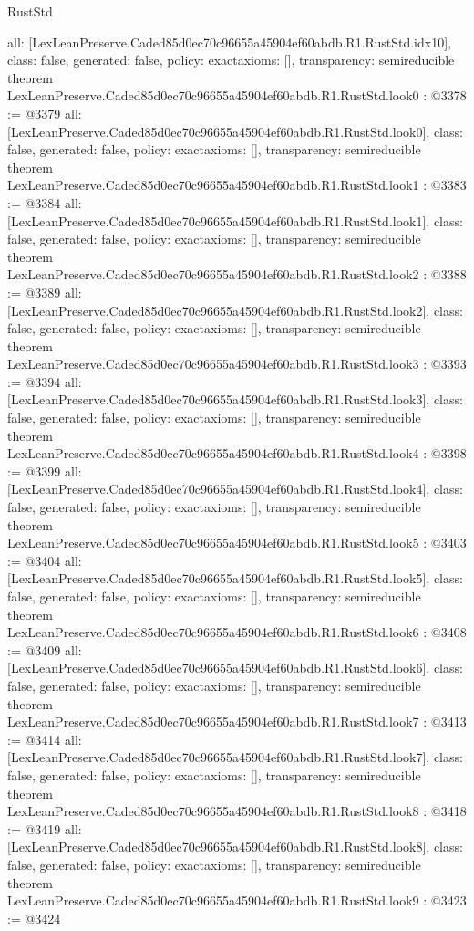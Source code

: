 \begin{lexlean}{RustStd}
\begin{coremodule}
{  all: [LexLeanPreserve.Caded85d0ec70c96655a45904ef60abdb.R1.RustStd.idx10],
  class: false,
  generated: false,
  policy: exact{axioms: []},
  transparency: semireducible
}
theorem LexLeanPreserve.Caded85d0ec70c96655a45904ef60abdb.R1.RustStd.look0 : @3378 := @3379 {
  all: [LexLeanPreserve.Caded85d0ec70c96655a45904ef60abdb.R1.RustStd.look0],
  class: false,
  generated: false,
  policy: exact{axioms: []},
  transparency: semireducible
}
theorem LexLeanPreserve.Caded85d0ec70c96655a45904ef60abdb.R1.RustStd.look1 : @3383 := @3384 {
  all: [LexLeanPreserve.Caded85d0ec70c96655a45904ef60abdb.R1.RustStd.look1],
  class: false,
  generated: false,
  policy: exact{axioms: []},
  transparency: semireducible
}
theorem LexLeanPreserve.Caded85d0ec70c96655a45904ef60abdb.R1.RustStd.look2 : @3388 := @3389 {
  all: [LexLeanPreserve.Caded85d0ec70c96655a45904ef60abdb.R1.RustStd.look2],
  class: false,
  generated: false,
  policy: exact{axioms: []},
  transparency: semireducible
}
theorem LexLeanPreserve.Caded85d0ec70c96655a45904ef60abdb.R1.RustStd.look3 : @3393 := @3394 {
  all: [LexLeanPreserve.Caded85d0ec70c96655a45904ef60abdb.R1.RustStd.look3],
  class: false,
  generated: false,
  policy: exact{axioms: []},
  transparency: semireducible
}
theorem LexLeanPreserve.Caded85d0ec70c96655a45904ef60abdb.R1.RustStd.look4 : @3398 := @3399 {
  all: [LexLeanPreserve.Caded85d0ec70c96655a45904ef60abdb.R1.RustStd.look4],
  class: false,
  generated: false,
  policy: exact{axioms: []},
  transparency: semireducible
}
theorem LexLeanPreserve.Caded85d0ec70c96655a45904ef60abdb.R1.RustStd.look5 : @3403 := @3404 {
  all: [LexLeanPreserve.Caded85d0ec70c96655a45904ef60abdb.R1.RustStd.look5],
  class: false,
  generated: false,
  policy: exact{axioms: []},
  transparency: semireducible
}
theorem LexLeanPreserve.Caded85d0ec70c96655a45904ef60abdb.R1.RustStd.look6 : @3408 := @3409 {
  all: [LexLeanPreserve.Caded85d0ec70c96655a45904ef60abdb.R1.RustStd.look6],
  class: false,
  generated: false,
  policy: exact{axioms: []},
  transparency: semireducible
}
theorem LexLeanPreserve.Caded85d0ec70c96655a45904ef60abdb.R1.RustStd.look7 : @3413 := @3414 {
  all: [LexLeanPreserve.Caded85d0ec70c96655a45904ef60abdb.R1.RustStd.look7],
  class: false,
  generated: false,
  policy: exact{axioms: []},
  transparency: semireducible
}
theorem LexLeanPreserve.Caded85d0ec70c96655a45904ef60abdb.R1.RustStd.look8 : @3418 := @3419 {
  all: [LexLeanPreserve.Caded85d0ec70c96655a45904ef60abdb.R1.RustStd.look8],
  class: false,
  generated: false,
  policy: exact{axioms: []},
  transparency: semireducible
}
theorem LexLeanPreserve.Caded85d0ec70c96655a45904ef60abdb.R1.RustStd.look9 : @3423 := @3424 {
}
\end{coremodule}
\end{lexlean}
